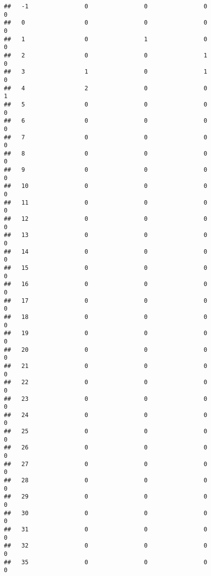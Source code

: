 \documentclass[]{article}
\begin{document}
\begin{verbatim}
##   -1                0                0                0               0
##   0                 0                0                0               0
##   1                 0                1                0               0
##   2                 0                0                1               0
##   3                 1                0                1               0
##   4                 2                0                0               1
##   5                 0                0                0               0
##   6                 0                0                0               0
##   7                 0                0                0               0
##   8                 0                0                0               0
##   9                 0                0                0               0
##   10                0                0                0               0
##   11                0                0                0               0
##   12                0                0                0               0
##   13                0                0                0               0
##   14                0                0                0               0
##   15                0                0                0               0
##   16                0                0                0               0
##   17                0                0                0               0
##   18                0                0                0               0
##   19                0                0                0               0
##   20                0                0                0               0
##   21                0                0                0               0
##   22                0                0                0               0
##   23                0                0                0               0
##   24                0                0                0               0
##   25                0                0                0               0
##   26                0                0                0               0
##   27                0                0                0               0
##   28                0                0                0               0
##   29                0                0                0               0
##   30                0                0                0               0
##   31                0                0                0               0
##   32                0                0                0               0
##   35                0                0                0               0

\end{verbatim}
\end{document}
